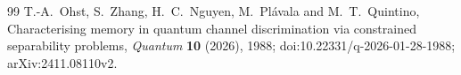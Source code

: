 \begin{thebibliography}{99}
 T.-A.~Ohst, S.~Zhang, H.~C.~Nguyen,
M.~Pl\'avala and M.~T.~Quintino,
Characterising memory in quantum channel discrimination via
constrained separability problems,
\emph{Quantum} \textbf{10} (2026), 1988;
doi:10.22331/q-2026-01-28-1988; arXiv:2411.08110v2.
\end{thebibliography}
